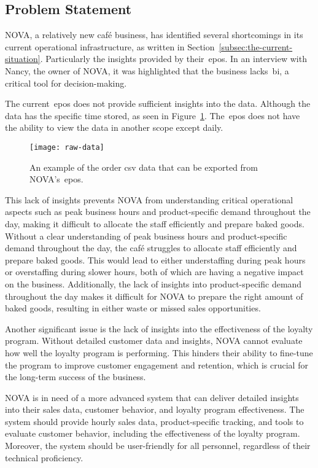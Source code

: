 \subsection{Problem Statement}\label{subsec:problem-statement}

NOVA, a relatively new café business, has identified several shortcomings in its current operational infrastructure,
as written in Section~\ref{subsec:the-current-situation}.
Particularly the insights provided by their~\acrfull{epos}.
In an interview with Nancy, the owner of NOVA, it was highlighted that the business lacks~\acrfull{bi}, a critical tool
for decision-making.

The current~\acrshort{epos} does not provide sufficient insights into the data.
Although the data has the specific time stored, as seen in Figure~\ref{fig:nova-csv-data}.
The~\acrshort{epos} does not have the ability to view the data in another scope except daily.

\begin{figure}[H]
    \centering
    \texttt{[image: raw-data]}
    \caption{An example of the order csv data that can be exported from NOVA's~\acrshort{epos}.
    }\label{fig:nova-csv-data}
\end{figure}

This lack of insights prevents NOVA from understanding critical operational aspects such as peak business hours and
product-specific demand throughout the day, making it difficult to allocate the staff efficiently and prepare baked
goods.
Without a clear understanding of peak business hours and product-specific demand throughout the day, the café struggles
to allocate staff efficiently and prepare baked goods.
This would lead to either understaffing during peak hours or overstaffing during slower hours, both of which are
having a negative impact on the business.
Additionally, the lack of insights into product-specific demand throughout the day makes it difficult for NOVA to
prepare the right amount of baked goods, resulting in either waste or missed sales opportunities.

Another significant issue is the lack of insights into the effectiveness of the loyalty program.
Without detailed customer data and insights, NOVA cannot evaluate how well the loyalty program is performing.
This hinders their ability to fine-tune the program to improve customer engagement and retention, which is crucial for
the long-term success of the business.

NOVA is in need of a more advanced system that can deliver detailed insights into their sales data, customer behavior,
and loyalty program effectiveness.
The system should provide hourly sales data, product-specific tracking, and tools to evaluate customer behavior,
including the effectiveness of the loyalty program.
Moreover, the system should be user-friendly for all personnel, regardless of their technical proficiency.

